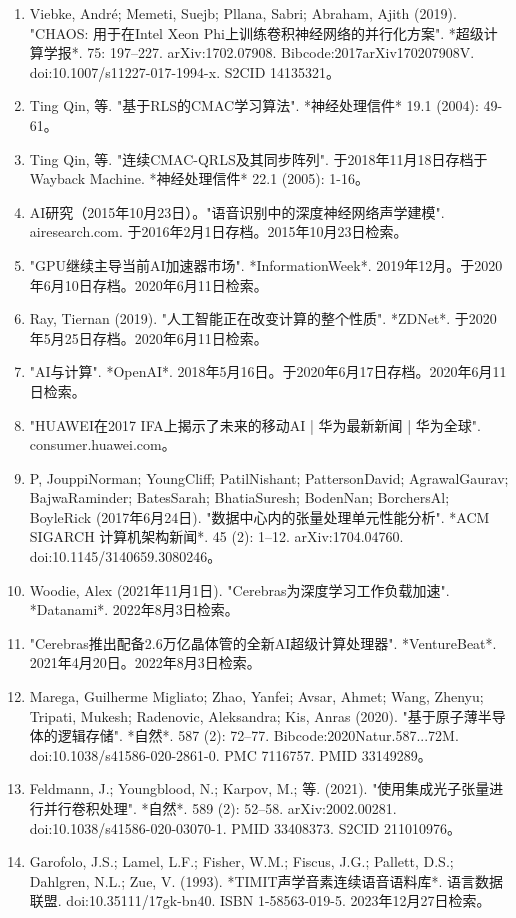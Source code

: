 \begin{enumerate}
\item Viebke, André; Memeti, Suejb; Pllana, Sabri; Abraham, Ajith (2019). "CHAOS: 用于在Intel Xeon Phi上训练卷积神经网络的并行化方案". *超级计算学报*. 75: 197–227. arXiv:1702.07908. Bibcode:2017arXiv170207908V. doi:10.1007/s11227-017-1994-x. S2CID 14135321。
\item Ting Qin, 等. "基于RLS的CMAC学习算法". *神经处理信件* 19.1 (2004): 49-61。
\item Ting Qin, 等. "连续CMAC-QRLS及其同步阵列". 于2018年11月18日存档于Wayback Machine. *神经处理信件* 22.1 (2005): 1-16。
\item AI研究（2015年10月23日）。"语音识别中的深度神经网络声学建模". airesearch.com. 于2016年2月1日存档。2015年10月23日检索。
\item "GPU继续主导当前AI加速器市场". *InformationWeek*. 2019年12月。于2020年6月10日存档。2020年6月11日检索。
\item Ray, Tiernan (2019). "人工智能正在改变计算的整个性质". *ZDNet*. 于2020年5月25日存档。2020年6月11日检索。
\item "AI与计算". *OpenAI*. 2018年5月16日。于2020年6月17日存档。2020年6月11日检索。
\item "HUAWEI在2017 IFA上揭示了未来的移动AI | 华为最新新闻 | 华为全球". consumer.huawei.com。
\item P, JouppiNorman; YoungCliff; PatilNishant; PattersonDavid; AgrawalGaurav; BajwaRaminder; BatesSarah; BhatiaSuresh; BodenNan; BorchersAl; BoyleRick (2017年6月24日). "数据中心内的张量处理单元性能分析". *ACM SIGARCH 计算机架构新闻*. 45 (2): 1–12. arXiv:1704.04760. doi:10.1145/3140659.3080246。
\item Woodie, Alex (2021年11月1日). "Cerebras为深度学习工作负载加速". *Datanami*. 2022年8月3日检索。
\item "Cerebras推出配备2.6万亿晶体管的全新AI超级计算处理器". *VentureBeat*. 2021年4月20日。2022年8月3日检索。
\item Marega, Guilherme Migliato; Zhao, Yanfei; Avsar, Ahmet; Wang, Zhenyu; Tripati, Mukesh; Radenovic, Aleksandra; Kis, Anras (2020). "基于原子薄半导体的逻辑存储". *自然*. 587 (2): 72–77. Bibcode:2020Natur.587...72M. doi:10.1038/s41586-020-2861-0. PMC 7116757. PMID 33149289。
\item Feldmann, J.; Youngblood, N.; Karpov, M.; 等. (2021). "使用集成光子张量进行并行卷积处理". *自然*. 589 (2): 52–58. arXiv:2002.00281. doi:10.1038/s41586-020-03070-1. PMID 33408373. S2CID 211010976。
\item Garofolo, J.S.; Lamel, L.F.; Fisher, W.M.; Fiscus, J.G.; Pallett, D.S.; Dahlgren, N.L.; Zue, V. (1993). *TIMIT声学音素连续语音语料库*. 语言数据联盟. doi:10.35111/17gk-bn40. ISBN 1-58563-019-5. 2023年12月27日检索。

\end{enumerate}

